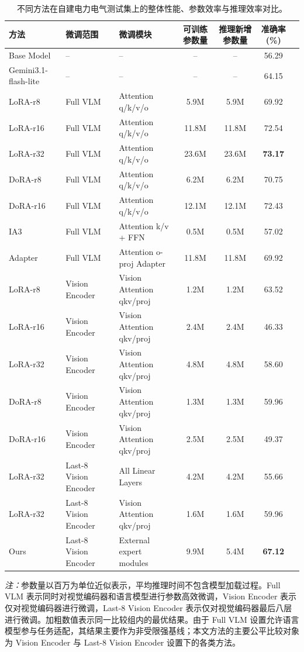 \documentclass[journal]{IEEEtran}
\begin{document}
\begin{table}[!t]
\centering
\caption{不同方法在自建电力电气测试集上的整体性能、参数效率与推理效率对比。}
\label{tab:main_result}
\begin{tabular}{lllcccc}
\toprule
方法 & 微调范围 & 微调模块 & 可训练参数量 & 推理新增参数量 & 准确率(\%) \\
\midrule

Base Model & -- & -- & -- & -- & 56.29 \\
Gemini3.1-flash-lite & -- & -- & -- & -- & 64.15 \\

\midrule
LoRA-r8 & Full VLM & Attention q/k/v/o & 5.9M & 5.9M & 69.92 \\
LoRA-r16 & Full VLM & Attention q/k/v/o & 11.8M & 11.8M & 72.54 \\
LoRA-r32 & Full VLM & Attention q/k/v/o & 23.6M & 23.6M & \textbf{73.17} \\
DoRA-r8 & Full VLM & Attention q/k/v/o & 6.2M & 6.2M & 70.75 \\
DoRA-r16 & Full VLM & Attention q/k/v/o & 12.1M & 12.1M & 72.43 \\
IA3 & Full VLM & Attention k/v + FFN & 0.5M & 0.5M & 57.02 \\
Adapter & Full VLM & Attention o-proj Adapter & 11.8M & 11.8M & 69.92 \\

\midrule
LoRA-r8 & Vision Encoder & Vision Attention qkv/proj & 1.2M & 1.2M & 63.52 \\
LoRA-r16 & Vision Encoder & Vision Attention qkv/proj & 2.4M & 2.4M & 46.33 \\
LoRA-r32 & Vision Encoder & Vision Attention qkv/proj & 4.8M & 4.8M & 58.60 & \\
DoRA-r8 & Vision Encoder & Vision Attention qkv/proj & 1.3M & 1.3M & 59.96 & \\
DoRA-r16 & Vision Encoder & Vision Attention qkv/proj & 2.5M & 2.5M & 49.37 & \\

LoRA-r32 & Last-8 Vision Encoder & All Linear Layers & 4.2M & 4.2M & 55.66 & \\
LoRA-r32 & Last-8 Vision Encoder & Vision Attention qkv/proj & 1.6M & 1.6M & 59.96 & \\
Ours & Last-8 Vision Encoder & External expert modules & 9.9M & 5.4M & \textbf{67.12} & \\

\bottomrule
\end{tabular}

\vspace{0.5em}
\footnotesize
\textit{注：}参数量以百万为单位近似表示，平均推理时间不包含模型加载过程。Full VLM 表示同时对视觉编码器和语言模型进行参数高效微调，Vision Encoder 表示仅对视觉编码器进行微调，Last-8 Vision Encoder 表示仅对视觉编码器最后八层进行微调。加粗数值表示同一比较组内的最优结果。由于 Full VLM 设置允许语言模型参与任务适配，其结果主要作为非受限强基线；本文方法的主要公平比较对象为 Vision Encoder 与 Last-8 Vision Encoder 设置下的各类方法。

\end{table}
\end{document}
